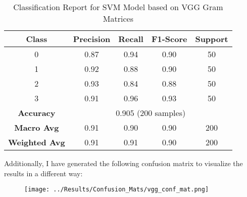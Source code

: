 \documentclass{article}
\begin{document}
\begin{table}[h!]
    \centering
    \begin{tabular}{|c|c|c|c|c|}
        \hline
        Class & Precision & Recall & F1-Score & Support \\
        \hline
        0 & 0.87 & 0.94 & 0.90 & 50 \\
        1 & 0.92 & 0.88 & 0.90 & 50 \\
        2 & 0.93 & 0.84 & 0.88 & 50 \\
        3 & 0.91 & 0.96 & 0.93 & 50 \\
        \hline
        \multicolumn{1}{|c|}{\textbf{Accuracy}} & \multicolumn{4}{c|}{0.905 (200 samples)} \\
        \hline
        \multicolumn{1}{|c|}{\textbf{Macro Avg}} & 0.91 & 0.90 & 0.90 & 200 \\
        \multicolumn{1}{|c|}{\textbf{Weighted Avg}} & 0.91 & 0.91 & 0.90 & 200 \\
        \hline
    \end{tabular}
    \caption{Classification Report for SVM Model based on VGG Gram Matrices}
    \label{tab:classification_report-vgg}
\end{table}


Additionally, I have generated the following confusion matrix to visualize the results in a different way:

\begin{figure}[H]
    \centering
    \texttt{[image: ../Results/Confusion\_Mats/vgg\_conf\_mat.png]}
    \label{fig:vgg-conf-mat}
\end{figure}
\end{document}
